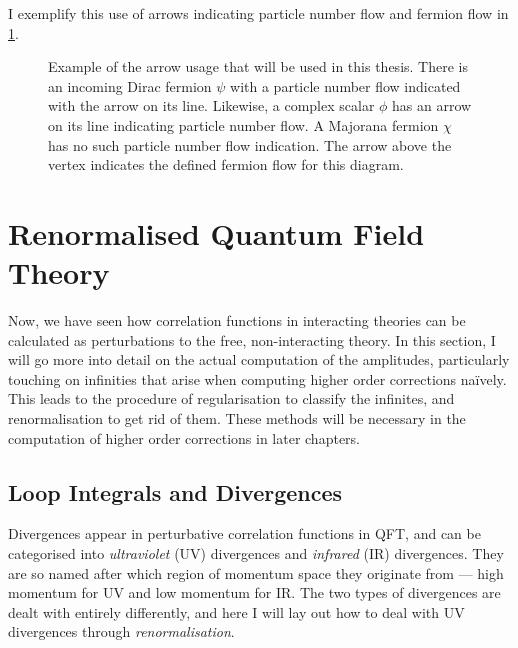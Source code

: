 \documentclass[../main.tex]{subfiles}
\begin{document}
I exemplify this use of arrows indicating particle number flow and fermion flow in \cref{qft:fig:feynman_flow}.

\begin{figure}[ht!]
  \centering
  \caption{Example of the arrow usage that will be used in this thesis.
    There is an incoming Dirac fermion \(\psi\) with a particle number flow indicated with the arrow on its line.
    Likewise, a complex scalar \(\phi\) has an arrow on its line indicating particle number flow.
    A Majorana fermion \(\chi\) has no such particle number flow indication.
    The arrow above the vertex indicates the defined fermion flow for this diagram.}
  \label{qft:fig:feynman_flow}
\end{figure}




\section{Renormalised Quantum Field Theory}
\label{qft:sec:renormalisation}
Now, we have seen how correlation functions in interacting theories can be calculated as perturbations to the free, non-interacting theory.
In this section, I will go more into detail on the actual computation of the amplitudes, particularly touching on infinities that arise when computing higher order corrections naïvely.
This leads to the procedure of regularisation to classify the infinites, and renormalisation to get rid of them.
These methods will be necessary in the computation of higher order corrections in later chapters.


\subsection{Loop Integrals and Divergences}
Divergences appear in perturbative correlation functions in QFT, and can be
categorised into \emph{ultraviolet} (UV) divergences and \emph{infrared} (IR)
divergences. They are so named after which region of momentum space they
originate from --- high momentum for UV and low momentum for IR\@. The two types
of divergences are dealt with entirely differently, and here I will lay out how
to deal with UV divergences through \emph{renormalisation}.
\medskip
\end{document}
